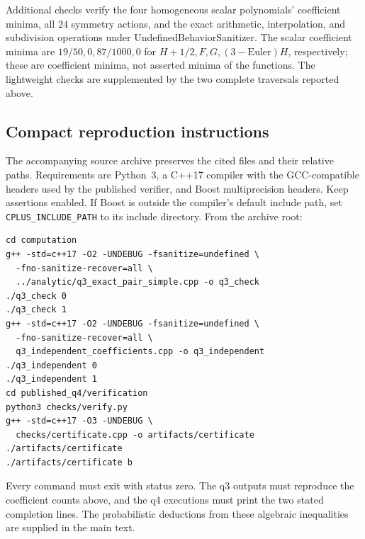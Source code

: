 Additional checks verify the four homogeneous scalar polynomials' coefficient minima, all \(24\) symmetry actions, and the exact arithmetic, interpolation, and subdivision operations under UndefinedBehaviorSanitizer.  The scalar coefficient minima are
\(19/50,0,87/1000,0\) for \(H+1/2,F,G,(3-\mathrm{Euler})H\),
respectively; these are coefficient minima, not asserted minima of the
functions.  The lightweight checks are supplemented by the two complete traversals reported above.

\subsection{Compact reproduction instructions}

The accompanying source archive preserves the cited files and their
relative paths.  Requirements are Python~3, a C++17 compiler with the
GCC-compatible headers used by the published verifier, and Boost
multiprecision headers.  Keep assertions enabled.  If Boost is outside
the compiler's default include path, set \texttt{CPLUS\_INCLUDE\_PATH}
to its include directory.  From the archive root:
\begin{verbatim}
cd computation
g++ -std=c++17 -O2 -UNDEBUG -fsanitize=undefined \
  -fno-sanitize-recover=all \
  ../analytic/q3_exact_pair_simple.cpp -o q3_check
./q3_check 0
./q3_check 1
g++ -std=c++17 -O2 -UNDEBUG -fsanitize=undefined \
  -fno-sanitize-recover=all \
  q3_independent_coefficients.cpp -o q3_independent
./q3_independent 0
./q3_independent 1
cd published_q4/verification
python3 checks/verify.py
g++ -std=c++17 -O3 -UNDEBUG \
  checks/certificate.cpp -o artifacts/certificate
./artifacts/certificate
./artifacts/certificate b
\end{verbatim}
Every command must exit with status zero.  The q3 outputs must reproduce
the coefficient counts above, and the q4 executions must print the two
stated completion lines. The probabilistic deductions from these algebraic inequalities are supplied in the main
text.

